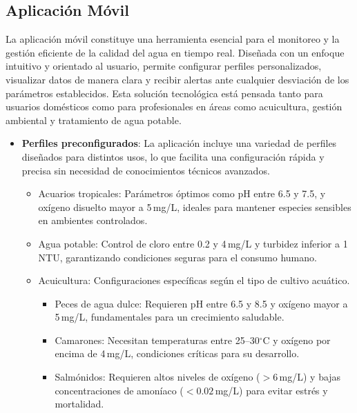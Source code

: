 \documentclass{article}
\begin{document}
\subsection{Aplicación Móvil}

La aplicación móvil constituye una herramienta esencial para el monitoreo y la gestión eficiente de la calidad del agua en tiempo real. Diseñada con un enfoque intuitivo y orientado al usuario, permite configurar perfiles personalizados, visualizar datos de manera clara y recibir alertas ante cualquier desviación de los parámetros establecidos. Esta solución tecnológica está pensada tanto para usuarios domésticos como para profesionales en áreas como acuicultura, gestión ambiental y tratamiento de agua potable.

\begin{itemize}
\item \textbf{Perfiles preconfigurados}: La aplicación incluye una variedad de perfiles diseñados para distintos usos, lo que facilita una configuración rápida y precisa sin necesidad de conocimientos técnicos avanzados.
  \begin{itemize}
  \item Acuarios tropicales: Parámetros óptimos como pH entre 6.5 y 7.5, y oxígeno disuelto mayor a 5\,mg/L, ideales para mantener especies sensibles en ambientes controlados.
  \item Agua potable: Control de cloro entre 0.2 y 4\,mg/L y turbidez inferior a 1\,NTU, garantizando condiciones seguras para el consumo humano.
  \item Acuicultura: Configuraciones específicas según el tipo de cultivo acuático.
    \begin{itemize}
    \item Peces de agua dulce: Requieren pH entre 6.5 y 8.5 y oxígeno mayor a 5\,mg/L, fundamentales para un crecimiento saludable.
    \item Camarones: Necesitan temperaturas entre 25--30$^\circ$C y oxígeno por encima de 4\,mg/L, condiciones críticas para su desarrollo.
    \item Salmónidos: Requieren altos niveles de oxígeno ($>6$\,mg/L) y bajas concentraciones de amoníaco ($<0.02$\,mg/L) para evitar estrés y mortalidad.
    \end{itemize}
  \end{itemize}
  

\end{itemize}
\end{document}
